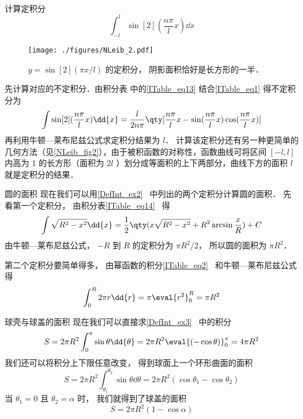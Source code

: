 \begin{example}{计算定积分}
\begin{equation}
\int_{-l}^l \sin[2](\frac{n\pi}{l} x) \dd{x}
\end{equation}

\begin{figure}[ht]
\centering
\texttt{[image: ./figures/NLeib\_2.pdf]}
\caption{$y = \sin[2](\pi x/l)$ 的定积分， 阴影面积恰好是长方形的一半．}\label{NLeib_fig2}
\end{figure}

先计算对应的不定积分．由积分表 中的\autoref{ITable_eq13} 结合\autoref{ITable_eq1} 得不定积分为
\begin{equation}
\int\sin[2](\frac{n\pi}{l} x) \dd{x} = \frac{l}{2n\pi} \qty[\frac{n\pi}{l} x - \sin(\frac{n\pi}{l} x)\cos(\frac{n\pi}{l} x)]
\end{equation}
再利用牛顿—莱布尼兹公式求定积分结果为 $l$． 计算该定积分还有另一种更简单的几何方法（见\autoref{NLeib_fig2}），由于被积函数的对称性，函数曲线可将区间 $[-l,l]$ 内高为 1 的长方形（面积为 $2l$ ）划分成等面积的上下两部分，曲线下方的面积 $l$ 就是定积分的结果．
\end{example}

\begin{example}{圆的面积}\label{NLeib_ex2}
现在我们可以用\autoref{DefInt_ex2}~ 中列出的两个定积分计算圆的面积． 先看第一个定积分， 由积分表\autoref{ITable_eq14}~ 得
\begin{equation}
\int \sqrt{R^2 - x^2} \dd{x} = \frac12 \qty(x\sqrt{R^2 - x^2} + R^2\arcsin\frac{x}{R}) + C
\end{equation}
由牛顿—莱布尼兹公式， $-R$ 到 $R$ 的定积分为 $\pi R^2/2$， 所以圆的面积为 $\pi R^2$．

第二个定积分要简单得多， 由幂函数的积分\autoref{ITable_eq2}~ 和牛顿—莱布尼兹公式得
\begin{equation}
\int_0^R 2\pi r \dd{r} = \pi \eval{r^2}_0^R = \pi R^2
\end{equation}
\end{example}

\begin{example}{球壳与球盖的面积}\label{NLeib_ex3}
现在我们可以直接求\autoref{DefInt_ex3}~ 中的积分
\begin{equation}
S = 2\pi R^2 \int_0^{\pi} \sin\theta \dd{\theta} = 2\pi R^2 \eval{(-\cos\theta)}_0^\pi = 4\pi R^2
\end{equation}
我们还可以将积分上下限任意改变， 得到球面上一个环形曲面的面积
\begin{equation}
S = 2\pi R^2 \int_{\theta_1}^{\theta_2} \sin\theta \dd{\theta} = 2\pi R^2 (\cos{\theta_1} - \cos{\theta_2})
\end{equation}
当 $\theta_1 = 0$ 且 $\theta_2 = \alpha$ 时， 我们就得到了球盖的面积
\begin{equation}
S = 2\pi R^2 (1 - \cos\alpha)
\end{equation}
\end{example}

